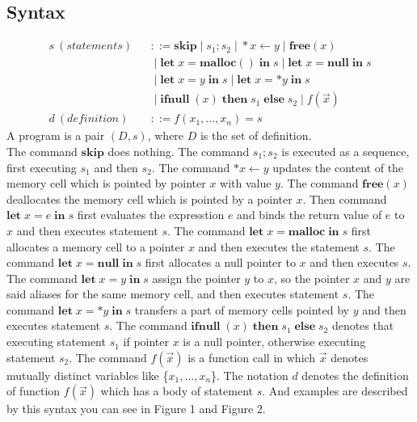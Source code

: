 \documentclass[english]{jssst_ppl} %
\newcommand\tB{\;|\;}
\newcommand\LET{\mathbf{let}\;}
\newcommand\IN{\mathbf{in}\;}
\newcommand\SKIP{\mathbf{skip}}
\newcommand\NULL{\mathbf{null}\;}
\newcommand\IFNULL{\mathbf{ifnull}\;}
\newcommand\THEN{\mathbf{then}\;}
\newcommand\ELSE{\mathbf{else}\;}
\newcommand\MALLOC{\mathbf{malloc()}\;}
\newcommand\Malloc{\mathbf{malloc}}
\newcommand\Free{\mathbf{free}}
\newcommand\Cirx{(x)}
\begin{document}
\subsection{Syntax}
\begin{eqnarray*}
  s \ (statements)& &::=  \SKIP \tB s_{1};s_{2} \tB *x \leftarrow y \tB \Free \Cirx \\
  & & \tB \LET x = \MALLOC \IN s \tB \LET x = \NULL \IN s  \\
  & & \tB \LET x = y \; \IN s \tB   \LET x = *y \; \IN s \\
  & &\tB \IFNULL(x) \; \THEN s_{1}\; \ELSE s_{2} \tB f(\vec{x})\\
  d \ (definition)& &::= f(x_{1},\dots,x_{n}) = s
\end{eqnarray*}
A program is a pair $(D,s)$, where $D$ is the set of definition.\\
The command $\SKIP$ does nothing. The command $s_{1};s_{2}$ is executed as a sequence, first executing $s_{1}$ and then $s_{2}$. The command $*x \leftarrow y$ updates the content of the memory cell which is pointed by pointer $x$ with value $y$. The command $\Free \Cirx$ deallocates the memory cell which is pointed by a pointer $x$. Then command $\LET x = e \; \IN s$ first evaluates the expresstion $e$ and binds the return value of $e$ to $x$ and then executes statement $s$. The command $\LET x = \Malloc \; \IN s$ first allocates a memory cell to a pointer $x$ and then executes the statement $s$. The command $\LET x = \NULL  \IN s$ first allocates a null pointer to $x$ and then executes $s$. The command $\LET x = y \; \IN s$ assign the pointer $y$ to $x$, so the pointer $x$ and $y$ are said aliases for the same memory cell, and then executes statement $s$. The command $\LET x = *y \; \IN s$ transfers a part of memory cells pointed by $y$ and then executes statement $s$. The command $\IFNULL(x) \; \THEN s_{1} \; \ELSE s_{2}$ denotes that  executing statement $s_{1}$ if pointer $x$ is a null pointer, otherwise executing statement $s_{2}$. The command $f(\vec{x})$ is a function call in which $\vec{x}$ denotes mutually distinct variables like \{$x_{1}, \dots, x_{n}$\}. The notation $d$ denotes the definition of function $f(\vec{x})$ which has a body of statement $s$. And examples are described by this syntax you can see in Figure 1 and  Figure 2.
\end{document}
